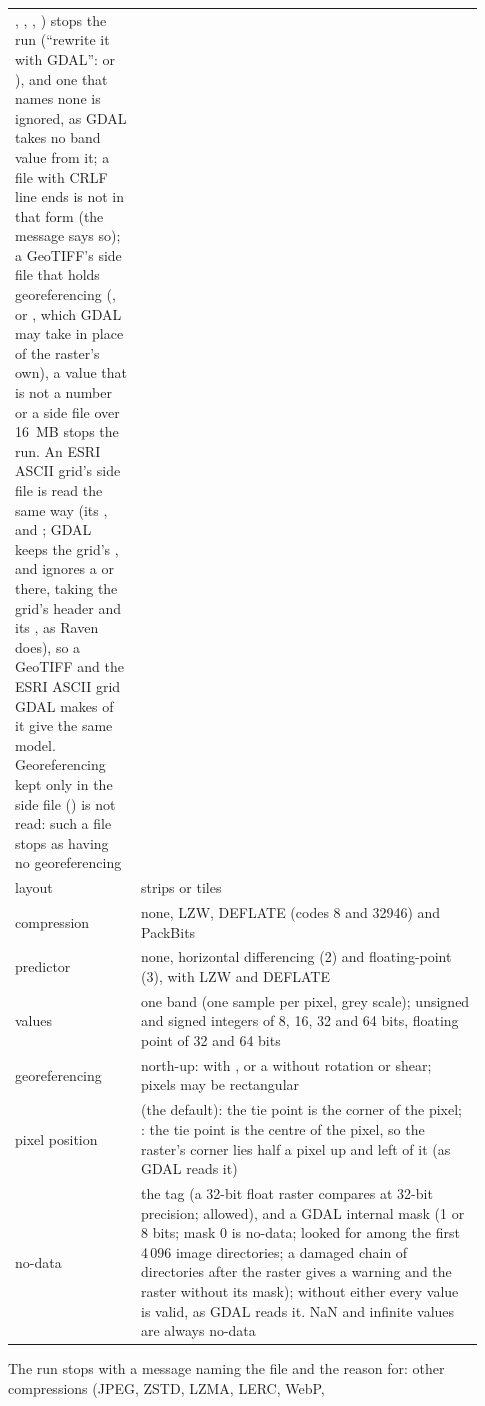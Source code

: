 \begin{center}
\begin{tabular}{P{0.25\linewidth}P{0.68\linewidth}}
, , , ) stops the run (``rewrite it with GDAL'': 
or ), and one that names none is ignored, as GDAL takes no band value from it; a file with CRLF line ends is not
in that form (the message says so); a GeoTIFF's side file that holds georeferencing (,  or ,
which GDAL may take in place of the raster's own), a value that is not a number or a side file over 16~MB stops the run. An ESRI ASCII grid's side file is read the same way (its ,
 and ; GDAL keeps the grid's , and ignores a  or  there, taking
the grid's header and its , as Raven does), so a GeoTIFF and the ESRI ASCII grid GDAL makes
of it give the same model. Georeferencing kept only in the side file () is not read: such a file stops as having no georeferencing\\
layout & strips or tiles\\
compression & none, LZW, DEFLATE (codes 8 and 32946) and PackBits\\
predictor & none, horizontal differencing (2) and floating-point (3), with LZW and DEFLATE\\
values & one band (one sample per pixel, grey scale); unsigned and signed integers of 8, 16, 32 and 64 bits, floating
point of 32 and 64 bits\\
georeferencing & north-up:  with , or a  without rotation
or shear; pixels may be rectangular\\
pixel position &  (the default): the tie point is the corner of the pixel; : the tie
point is the centre of the pixel, so the raster's corner lies half a pixel up and left of it (as GDAL reads it)\\
no-data & the  tag (a 32-bit float raster compares at 32-bit precision;  allowed), and a GDAL
internal mask (1 or 8 bits; mask 0 is no-data; looked for among the first 4\,096 image directories; a damaged
chain of directories after the raster gives a warning and the raster without its mask); without either every value is valid, as GDAL reads it. NaN and infinite
values are always no-data\\
\bottomrule
\end{tabular}
\end{center}
The run stops with a message naming the file and the reason for: other compressions (JPEG, ZSTD, LZMA, LERC, WebP,
